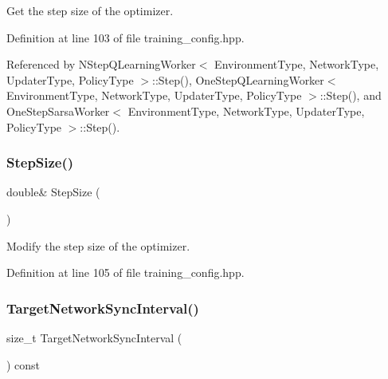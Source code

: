 Get the step size of the optimizer. 



Definition at line 103 of file training\+\_\+config.\+hpp.



Referenced by N\+Step\+Q\+Learning\+Worker$<$ Environment\+Type, Network\+Type, Updater\+Type, Policy\+Type $>$\+::\+Step(), One\+Step\+Q\+Learning\+Worker$<$ Environment\+Type, Network\+Type, Updater\+Type, Policy\+Type $>$\+::\+Step(), and One\+Step\+Sarsa\+Worker$<$ Environment\+Type, Network\+Type, Updater\+Type, Policy\+Type $>$\+::\+Step().

\mbox{\label{classmlpack_1_1rl_1_1TrainingConfig_af6b273aba48a984b2847aa1593e09477}} 
\subsubsection{Step\+Size()\hspace{0.1cm}{\footnotesize\ttfamily [2/2]}}
{\footnotesize\ttfamily double\& Step\+Size (\begin{DoxyParamCaption}{ }\end{DoxyParamCaption})\hspace{0.3cm}{\ttfamily [inline]}}



Modify the step size of the optimizer. 



Definition at line 105 of file training\+\_\+config.\+hpp.

\mbox{\label{classmlpack_1_1rl_1_1TrainingConfig_ad050465e611df6ecca98f5d98a785f03}} 
\subsubsection{Target\+Network\+Sync\+Interval()\hspace{0.1cm}{\footnotesize\ttfamily [1/2]}}
{\footnotesize\ttfamily size\+\_\+t Target\+Network\+Sync\+Interval (\begin{DoxyParamCaption}{ }\end{DoxyParamCaption}) const\hspace{0.3cm}{\ttfamily [inline]}}



